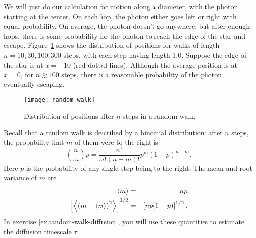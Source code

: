 We will just do our calculation for motion along a diameter, with the photon starting at the center. On each hop, the photon either goes left or right with equal probability. On average, the photon doesn't go anywhere; but after enough hops, there is some probability for the photon to reach the edge of the star and escape. Figure~\ref{f.random-walk} shows the distribution of positions for walks of length $n = 10, 30, 100, 300$ steps, with each step having length 1.0. Suppose the edge of the star is at $x=\pm 10$ (red dotted lines).  Although the average position is at $x=0$, for $n \gtrsim 100$ steps, there is a reasonable probability of the photon eventually escaping.
\begin{figure}[htbp]
\forceversofloat
\texttt{[image: random-walk]}
\caption[Distribution of positions in a random walk]{\label{f.random-walk} Distribution of positions after $n$ steps in a random walk.}
\end{figure}

Recall that a random walk is described by a binomial distribution: after $n$ steps, the probability that $m$ of them were to the right is
\begin{equation}\label{e.binomial}
    \binom{n}{m}{p} = \frac{n!}{m!(n-m)!} p^{m}(1-p)^{n-m}.
\end{equation}
Here $p$ is the probability of any single step being to the right.
The mean and root variance of $m$ are
\begin{eqnarray}
	\left\langle m\right\rangle &=& np \label{e.mean-binomial} \\
	\left[\left\langle\left(m-\left\langle m\right\rangle\right)^{2}\right\rangle\right]^{1/2} &=& \left[np(1-p)\right]^{1/2}. \label{e.var-binomial}
\end{eqnarray}
In exercise \ref{ex.random-walk-diffusion}, you will use these quantities to estimate the diffusion timescale $\tau$.

